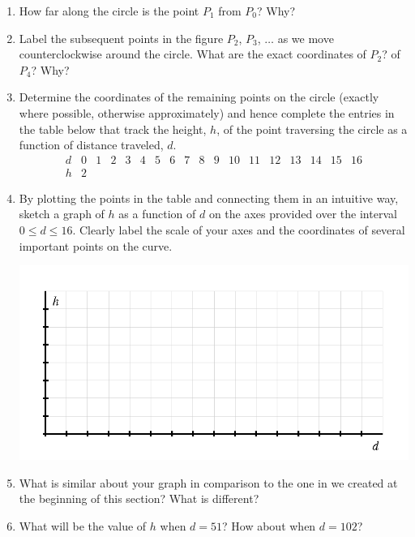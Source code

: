 \documentclass[nooutcomes, noauthor]{ximera}
\begin{document}
\begin{exploration}
\begin{enumerate}[label=\alph*.]
\item
How far along the circle is the point \(P_1\) from \(P_0\)?  Why?%
\item
Label the subsequent points in the figure \(P_2\), \(P_3\), \(\ldots\) as we move counterclockwise around the circle.  What are the exact coordinates of \(P_2\)?  of \(P_4\)?  Why?%
\item
Determine the coordinates of the remaining points on the circle (exactly where possible, otherwise approximately) and hence complete the entries in the table below that track the height, \(h\), of the point traversing the circle as a function of distance traveled, \(d\).%
$$
\begin{array}{c|ccccccccccccccccc}
d&0&1&2&3&4&5&6&7&8&9&10&11&12&13&14&15&16\\
\hline
h&2&&&&&&&&&&&&&&&
\end{array}
$$
\item
By plotting the points in the table and connecting them in an intuitive way, sketch a graph of \(h\) as a function of \(d\) on the axes provided over the interval \(0 \le d \le 16\).  Clearly label the scale of your axes and the coordinates of several important points on the curve.
\begin{image}
\includegraphics{traversing-act-circular-grid.png}
\end{image}
\item
What is similar about your graph in comparison to the one in we created at the beginning of this section?  What is different?%
\item
What will be the value of \(h\) when \(d = 51\)?  How about when \(d = 102\)?%
\end{enumerate}

\end{exploration}
\end{document}
